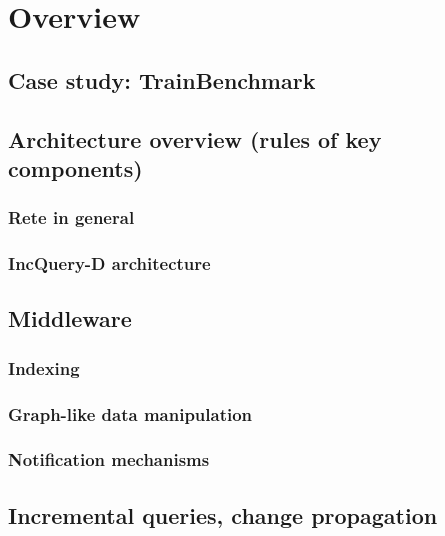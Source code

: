 \chapter{Overview}

\section{Case study: TrainBenchmark}


\section{Architecture overview (rules of key components)}

\subsection{Rete in general}
\label{subsec:rete}


\subsection{IncQuery-D architecture}


\section{Middleware}

\subsection{Indexing}

\subsection{Graph-like data manipulation}

\subsection{Notification mechanisms}

\section{Incremental queries, change propagation}

